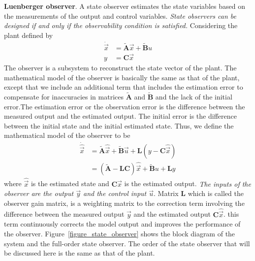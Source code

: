 \documentclass[11pt,a4paper,oneside]{book}
\numberwithin{equation}{section}
\theoremstyle{it}
\theoremstyle{definition}
\begin{document}
\vspace{5mm}
\textbf{Luenberger observer}. A state observer estimates the state variables based 
on the measurements of the output and control variables. \textit{State 
	observers can be designed if and only if the observability condition is 
	satisfied.}
Considering the plant defined by
\begin{equation} \label{state_observer_1}
	\begin{split}
		\dot{\vec x} & = \tilde{\mathbf{A}}\vec{x} + \tilde{\mathbf{B}}u \\[6pt]
		y & = \mathbf{C}\vec{x}
	\end{split}
\end{equation}
The observer is a subsystem to reconstruct the state vector of the plant. The 
mathematical model of the observer is basically the same as that of the plant, 
except that we include an additional term that includes the estimation error to 
compensate for inaccuracies in matrices $\tilde{\mathbf{A}}$ and 
$\tilde{\mathbf{B}}$ and the lack of the initial error.The estimation error or 
the observation error is the difference between the measured output and the 
estimated output. The initial error is the difference between the initial state 
and the initial estimated state. Thus, we define the mathematical model of the 
observer to be
\begin{equation} \label{state_observer_2}
	\begin{split}
		\dot{\hat{\vec{x}}} & = \tilde{\mathbf{A}}\hat{\vec x} + 
		\tilde{\mathbf{B}}\vec u + \mathbf{L}(y - \mathbf{C}\hat{\vec x}) 
		\\
		& = (\tilde{\mathbf{A}}-\mathbf{L}\mathbf{C})\hat{\vec x} + 
		\tilde{\mathbf{B}}u + \mathbf{L}y
	\end{split}
\end{equation}
where $\hat{\vec x}$ is the estimated state and $\mathbf{C}\hat{\vec x}$ is the 
estimated output. \textit{The inputs of the observer are the output $\vec y$ 
	and the control input $\vec u$}. Matrix $\mathbf{L}$ which is called the 
observer gain matrix, is a weighting matrix to the correction term involving 
the difference between the measured output $\vec y$ and the estimated output 
$\mathbf{C}\hat{\vec x}$. this term continuously corrects the model output and 
improves 
the performance of the observer. Figure~\ref{figure_state_observer} shows the 
block diagram of the system and the full-order state observer.
The order of the state observer that will be discussed here is the same as that 
of the plant.
\end{document}
